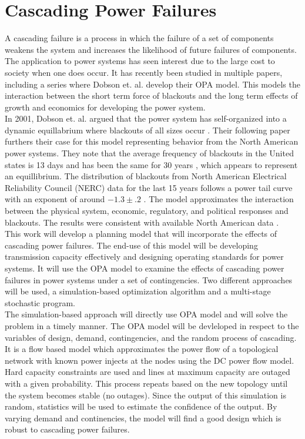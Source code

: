 \chapter{Cascading Power Failures}

A cascading failure is a process in which the failure of a set of components weakens the system and increases the likelihood of future failures of components.  The application to power systems has seen interest due to the large cost to society when one does occur.  It has recently been studied in multiple papers, including a series where Dobson et. al. develop their OPA model.  This models the interaction between the short term force of blackouts and the long term effects of growth and economics for developing the power system.  \\

In 2001, Dobson et. al. argued that the power system has self-organized into a dynamic equillabrium where blackouts of all sizes occur \cite{Dobson_2001}.  Their following paper furthers their case for this model representing behavior from the North American power systems.  They note that the average frequency of blackouts in the United states is 13 days and has been the same for 30 years \cite{Carreras_2004}, which appears to represent an equillibrium.  The distribution of blackouts from North American Electrical Reliability Council (NERC) data for the last 15 years follows a power tail curve with an exponent of around $-1.3\pm.2$ \cite{Carreras_2004}.  The model approximates the interaction between the physical system, economic, regulatory, and political responses and blackouts.  The results were consistent with available North American data \cite{Carreras_2004}. \\

This work will develop a planning model that will incorporate the effects of cascading power failures.  The end-use of this model will be developing transmission capacity effectively and designing operating standards for power systems.  It will use the OPA model to examine the effects of cascading power failures in power systems under a set of contingencies.  Two different approaches will be used, a simulation-based optimization algorithm and a multi-stage stochastic program.  \\

The simulation-based approach will directly use OPA model and will solve the problem in a timely manner.  The OPA model will be devleloped in respect to the variables of design, demand, contingencies, and the random process of cascading.  It is a flow based model which approximates the power flow of a topological network with known power injects at the nodes using the DC power flow model.  Hard capacity constraints are used and lines at maximum capacity are outaged with a given probability.  This process repeats based on the new topology until the system becomes stable (no outages). Since the output of this simulation is random, statistics will be used to estimate the confidence of the output.  By varying demand and continencies, the model will find a good design which is robust to cascading power failures.  \\

